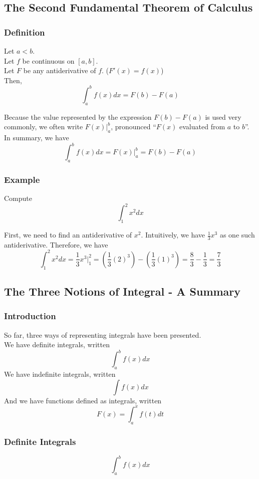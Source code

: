 \documentclass[10pt]{article}
\newenvironment{theorem}[1][]{\begin{tcolorbox}[colframe=_blue,colback=_blue2,title=Theorem. \ifthenelse{\isempty{#1}}{}{(#1)}
]}{\end{tcolorbox}}
\newenvironment{solution}{\begin{tcolorbox}[colframe=_grey,colback=white,arc=0pt,outer arc=0pt]}{\end{tcolorbox}}
\begin{document}
\subsection{The Second Fundamental Theorem of Calculus}
\subsubsection{Definition}
\begin{theorem}
Let $a<b$. \\
Let $f$ be continuous on $[a,b]$. \\
Let $F$ be any antiderivative of $f$. ($F'(x)=f(x)$) \\
Then,
$$
    \int_a^b f(x)dx=F(b)-F(a)  
$$
\end{theorem}
Because the value represented by the expression $F(b)-F(a)$ is used very commonly, we often write $\displaystyle F(x)\Big|_a^b$, pronounced ``$F(x)$ evaluated from $a$ to $b$''. In summary, we have
$$
    \int_a^bf(x)dx=F(x)\Big|_a^b=F(b)-F(a)
$$
\subsubsection{Example}
Compute
$$
    \int_1^2x^2dx
$$
\begin{solution}
    First, we need to find an antiderivative of $x^2$. Intuitively, we have $\frac{1}{3}x^3$ as one such antiderivative. Therefore, we have
    $$
        \int_1^2x^2dx=\frac{1}{3}x^3\Big|_1^2=\left(\frac{1}{3}(2)^3\right)-\left(\frac{1}{3}(1)^3\right)=\frac{8}{3}-\frac{1}{3}=\frac{7}{3}
    $$
\end{solution}
\subsection{The Three Notions of Integral - A Summary}
\subsubsection{Introduction}
So far, three ways of representing integrals have been presented. \\
We have definite integrals, written
$$
    \int_a^b f(x)dx
$$
We have indefinite integrals, written
$$
    \int f(x)dx
$$
And we have functions defined as integrals, written
$$
    F(x)=\int_a^xf(t)dt
$$
\subsubsection{Definite Integrals}
$$
    \int_a^b f(x)dx
$$
\end{document}
